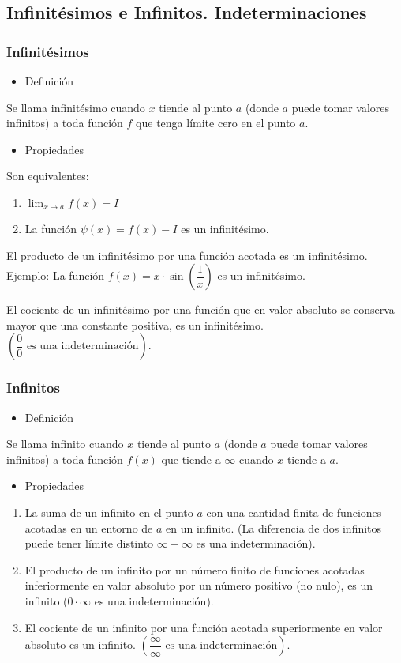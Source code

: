 \subsection{Infinitésimos e Infinitos. Indeterminaciones}
\subsubsection{Infinitésimos}
\begin{itemize}[label=\color{red}\textbullet, leftmargin=*]
	\item \color{lightblue}Definición
\end{itemize}
Se llama infinitésimo cuando $x$ tiende al punto $a$ (donde $a$ puede tomar valores infinitos) a toda función $f$ que tenga límite cero en el punto $a$.
\begin{itemize}[label=\color{red}\textbullet, leftmargin=*]
	\item \color{lightblue} Propiedades
\end{itemize}
Son equivalentes:
\begin{enumerate}[label=\arabic*)]
	\item $\lim_{x\to a}f(x)=I$
	\item La función $\psi(x)=f(x)-I$ es un infinitésimo.
\end{enumerate}
El producto de un infinitésimo por una función acotada es un infinitésimo. Ejemplo: La función $f(x)=x\cdot\sin\left(\dfrac{1}{x}\right)$ es un infinitésimo.

El cociente de un infinitésimo por una función que en valor absoluto se conserva mayor que una constante positiva, es un infinitésimo. $\left(\dfrac{0}{0}\text{ es una indeterminación}\right)$.
\subsubsection{Infinitos}
\begin{itemize}[label=\color{red}\textbullet, leftmargin=*]
	\item \color{lightblue}Definición
\end{itemize}
Se llama infinito cuando $x$ tiende al punto $a$ (donde $a$ puede tomar valores infinitos) a toda función $f(x)$ que tiende a $\infty$ cuando $x$ tiende a $a$.
\begin{itemize}[label=\color{red}\textbullet, leftmargin=*]
	\item \color{lightblue}Propiedades
\end{itemize}
\begin{enumerate}[label=\arabic*)]
	\item La suma de un infinito en el punto  $a$ con una cantidad finita de funciones acotadas en un entorno de $a$ en un infinito. (La diferencia de dos infinitos puede tener límite distinto $\infty-\infty$ es una indeterminación).
	\item El producto de un infinito por un número finito de funciones acotadas inferiormente en valor absoluto por un número positivo (no nulo), es un infinito ($0\cdot\infty$ es una indeterminación).
	\item El cociente de un infinito por una función acotada superiormente en valor absoluto es un infinito. $\left(\dfrac{\infty}{\infty}\text{ es una indeterminación}\right)$.
\end{enumerate}
